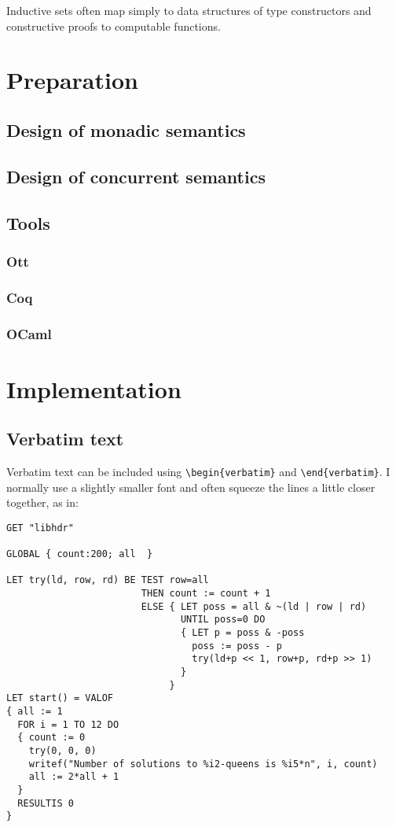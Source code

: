 \documentclass[12pt,twoside,notitlepage]{report}
\renewcommand{\baselinestretch}{1.1}    %
\begin{document}
Inductive sets often map simply to data structures of type constructors and constructive proofs to computable functions. 

\chapter{Preparation}

\section{Design of monadic semantics}

\section{Design of concurrent semantics}

\section{Tools}
\subsection{Ott}
\subsection{Coq}
\subsection{OCaml}

\cleardoublepage
\chapter{Implementation}

\section{Verbatim text}

Verbatim text can be included using \verb|\begin{verbatim}| and
\verb|\end{verbatim}|. I normally use a slightly smaller font and
often squeeze the lines a little closer together, as in:

{\renewcommand{\baselinestretch}{0.8}\small\begin{verbatim}
GET "libhdr"
 
GLOBAL { count:200; all  }
 
LET try(ld, row, rd) BE TEST row=all
                        THEN count := count + 1
                        ELSE { LET poss = all & ~(ld | row | rd)
                               UNTIL poss=0 DO
                               { LET p = poss & -poss
                                 poss := poss - p
                                 try(ld+p << 1, row+p, rd+p >> 1)
                               }
                             }
LET start() = VALOF
{ all := 1
  FOR i = 1 TO 12 DO
  { count := 0
    try(0, 0, 0)
    writef("Number of solutions to %i2-queens is %i5*n", i, count)
    all := 2*all + 1
  }
  RESULTIS 0
}
\end{verbatim}
}
\end{document}
